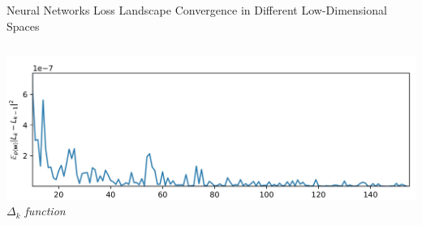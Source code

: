 \documentclass[10pt]{beamer}
\begin{document}
\begin{frame}{Neural Networks Loss Landscape Convergence in Different Low-Dimensional Spaces}
\begin{columns}[t]
    \centering
    \vspace*{-3.3cm}
    \hspace*{-2.2cm}
    \includegraphics[width=1.6\textwidth]{img/D_32.jpg}\\
    \hspace*{-1.2cm}
    \scriptsize \textit{$\Delta_k$ function}
\end{columns}

\end{frame}
\end{document}
